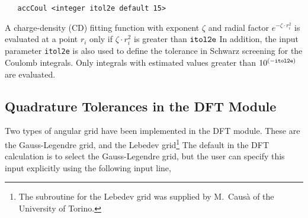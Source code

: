 \begin{verbatim}
   accCoul <integer itol2e default 15>
\end{verbatim}

A  charge-density (CD) fitting function with exponent $\zeta$
and radial factor $e^{-\zeta\cdot r_i^2}$ is evaluated  at a 
point $r_i$ only if $\zeta\cdot r_i^2$ is greater than ${\tt itol2e}$
In addition, the input
parameter {\tt itol2e} is also used to define the tolerance  in Schwarz 
screening for the Coulomb integrals.  Only integrals with estimated
values greater than $10^{(-{\tt itol2e})}$ are evaluated.


\subsection{Quadrature Tolerances in the DFT Module}

Two types of angular grid have been implemented in the DFT module.  These
are the Gauss-Legendre grid, and the Lebedev grid\footnote{The subroutine 
for the Lebedev grid was supplied by M.~Caus\`a of the University of Torino.}
The default in the DFT calculation is to select the Gauss-Legendre grid,
but the user can specify this input explicitly using the following input
line,


